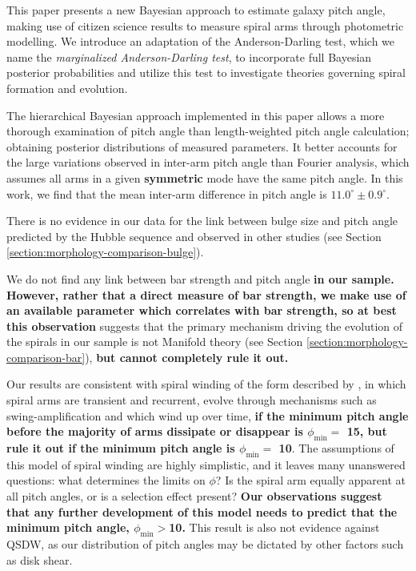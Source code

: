 \label{section:summary}
This paper presents a new Bayesian approach to estimate galaxy pitch angle, making use of citizen science results to measure spiral arms through photometric modelling. We introduce an adaptation of the Anderson-Darling test, which we name the \textit{marginalized Anderson-Darling test}, to incorporate full Bayesian posterior probabilities and utilize this test to investigate theories governing spiral formation and evolution.

The hierarchical Bayesian approach implemented in this paper allows a more thorough examination of pitch angle than length-weighted pitch angle calculation; obtaining posterior distributions of measured parameters. It better accounts for the large variations observed in inter-arm pitch angle than Fourier analysis, which assumes all arms in a given \textbf{symmetric} mode have the same pitch angle. In this work, we find that the mean inter-arm difference in pitch angle is $11.0^\circ\pm 0.9^\circ$.

There is no evidence in our data for the link between bulge size and pitch angle predicted by the Hubble sequence and observed in other studies (see Section \ref{section:morphology-comparison-bulge}).

We do not find any link between bar strength and pitch angle \textbf{in our sample. However, rather that a direct measure of bar strength, we make use of an available parameter which correlates with bar strength, so at best this observation} suggests that the primary mechanism driving the evolution of the spirals in our sample is not Manifold theory (see Section \ref{section:morphology-comparison-bar}), \textbf{but cannot completely rule it out.}

Our results are consistent with spiral winding of the form described by \citet{2019arXiv190910291P}, in which spiral arms are transient and recurrent, evolve through mechanisms such as swing-amplification \citep{1965MNRAS.130..125G} and which wind up over time, \textbf{if the minimum pitch angle before the majority of arms dissipate or disappear is $\phi_\mathrm{min} = $ {15\degree}, but rule it out if the minimum pitch angle is $\phi_\mathrm{min} = $ {10\degree}}. The assumptions of this model of spiral winding are highly simplistic, and it leaves many unanswered questions: what determines the limits on $\phi$? Is the spiral arm equally apparent at all pitch angles, or is a selection effect present? \textbf{Our observations suggest that any further development of this model needs to predict that the minimum pitch angle, $\phi_\mathrm{min}>${10\degree}.} This result is also not evidence against QSDW, as our distribution of pitch angles may be dictated by other factors such as disk shear.

